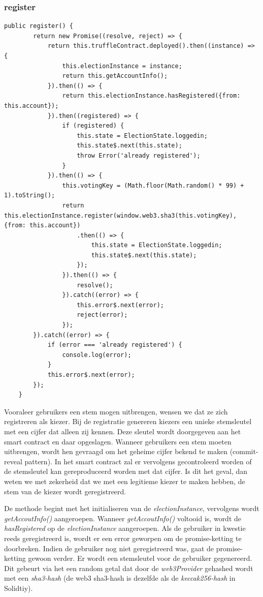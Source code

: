 	\subsubsection{register}
	\lstset{language=JavaScriptSolidity} 
	\begin{lstlisting}[numbers=none]
	public register() {
		return new Promise((resolve, reject) => {
			return this.truffleContract.deployed().then((instance) => {
				this.electionInstance = instance;
				return this.getAccountInfo();
			}).then(() => {
				return this.electionInstance.hasRegistered({from: this.account});
			}).then((registered) => {
				if (registered) {
					this.state = ElectionState.loggedin;
					this.state$.next(this.state);
					throw Error('already registered');
				}
			}).then(() => {
				this.votingKey = (Math.floor(Math.random() * 99) + 1).toString();
				return this.electionInstance.register(window.web3.sha3(this.votingKey), {from: this.account})
					.then(() => {
						this.state = ElectionState.loggedin;
						this.state$.next(this.state);
					});
				}).then(() => {
					resolve();
				}).catch((error) => {
					this.error$.next(error);
					reject(error);
				});
		}).catch((error) => {
			if (error === 'already registered') {
				console.log(error);
			}
			this.error$.next(error);
		});
	}
	\end{lstlisting}
		Vooraleer gebruikers een stem mogen uitbrengen, wensen we dat ze zich registreren als kiezer. Bij de registratie genereren kiezers een unieke stemsleutel met een cijfer dat alleen zij kennen. Deze sleutel wordt doorgegeven aan het smart contract en daar opgeslagen. Wanneer gebruikers een stem moeten uitbrengen, wordt hen gevraagd om het geheime cijfer bekend te maken (commit-reveal pattern). In het smart contract zal er vervolgens gecontroleerd worden of de stemsleutel kan gereproduceerd worden met dat cijfer. Is dit het geval, dan weten we met zekerheid dat we met een legitieme kiezer te maken hebben, de stem van de kiezer wordt geregistreerd.
		
		De methode begint met het initialiseren van de \textit{electionInstance}, vervolgens wordt \textit{getAccoutInfo()} aangeroepen. Wanneer \textit{getAccoutInfo()} voltooid is, wordt de \textit{hasRegistered} op de \textit{electionInstance} aangeroepen. Als de gebruiker in kwestie reeds geregistreerd is, wordt er een error geworpen om de promise-ketting te doorbreken. Indien de gebruiker nog niet geregistreerd was, gaat de promise-ketting gewoon verder. Er wordt een stemsleutel voor de gebruiker gegenereerd. Dit gebeurt via het een random getal dat door de \textit{web3Provider} gehashed wordt met een \textit{sha3-hash} (de web3 sha3-hash is dezelfde als de \textit{keccak256-hash} in Solidtiy).
		
